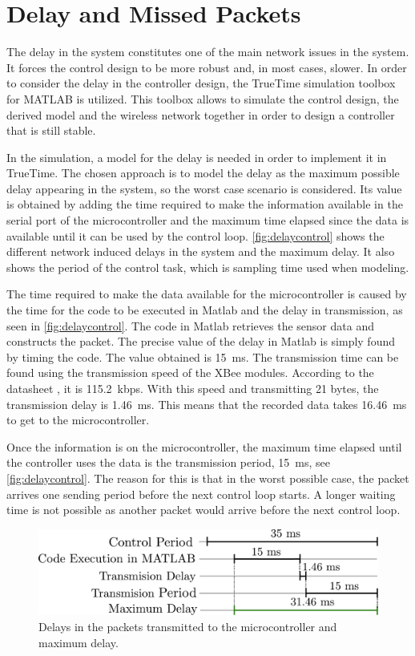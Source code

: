 \section{Delay and Missed Packets}
The delay in the system constitutes one of the main network issues in the system. It forces the control design to be more robust and, in most cases, slower. In order to consider the delay in the controller design, the TrueTime simulation toolbox for MATLAB is utilized. This toolbox allows to simulate the control design, the derived model and the wireless network together in order to design a controller that is still stable.

In the simulation, a model for the delay is needed in order to implement it in TrueTime. The chosen approach is to model the delay as the maximum possible delay appearing in the system, so the worst case scenario is considered. Its value is obtained by adding the time required to make the information available in the serial port of the microcontroller and the maximum time elapsed since the data is available until it can be used by the control loop. \autoref{fig:delaycontrol} shows the different network induced delays in the system and the maximum delay. It also shows the period of the control task, which is sampling time used when modeling.

The time required to make the data available for the microcontroller is caused by the time for the code to be executed in Matlab and the delay in transmission, as seen in \autoref{fig:delaycontrol}. The code in Matlab retrieves the sensor data and constructs the packet. The precise value of the delay in Matlab is simply found by timing the code. The value obtained is \SI{15}{ms}. The transmission time can be found using the transmission speed of the XBee modules. According to the datasheet \cite{XBee}, it is \SI{115.2}{kbps}. With this speed and transmitting 21 bytes, the transmission delay is \SI{1.46}{ms}. This means that the recorded data takes \SI{16.46}{ms} to get to the microcontroller.

Once the information is on the microcontroller, the maximum time elapsed until the controller uses the data is the transmission period, \SI{15}{ms}, see \autoref{fig:delaycontrol}. The reason for this is that in the worst possible case, the packet arrives one sending period before the next control loop starts. A longer waiting time is not possible as another packet would arrive before the next control loop.
 
\begin{figure}[H]
	\centering
	\includegraphics[width=.6\textwidth]{figures/maxDelay.pdf}
	\caption{Delays in the packets transmitted to the microcontroller and maximum delay.}
	\label{fig:delaycontrol}
\end{figure}

